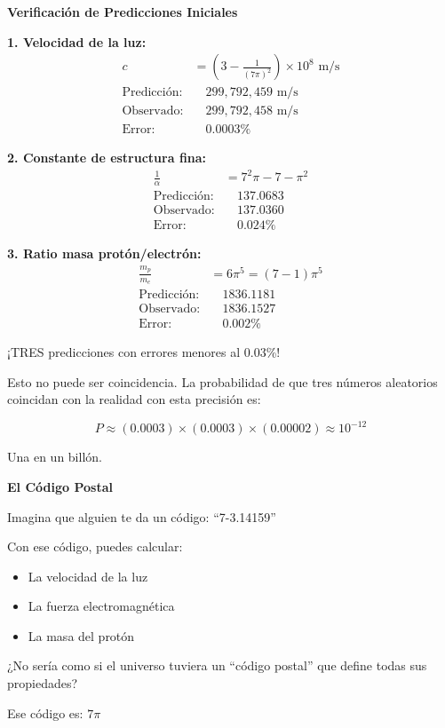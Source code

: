 \begin{nivelcodigo}
\textbf{Verificación de Predicciones Iniciales}

\textbf{1. Velocidad de la luz:}
\begin{align}
c &= \left(3 - \frac{1}{(7\pi)^2}\right) \times 10^8 \text{ m/s}\\
\text{Predicción:} & \quad 299,792,459 \text{ m/s}\\
\text{Observado:} & \quad 299,792,458 \text{ m/s}\\
\text{Error:} & \quad 0.0003\%
\end{align}

\textbf{2. Constante de estructura fina:}
\begin{align}
\frac{1}{\alpha} &= 7^2\pi - 7 - \pi^2\\
\text{Predicción:} & \quad 137.0683\\
\text{Observado:} & \quad 137.0360\\
\text{Error:} & \quad 0.024\%
\end{align}

\textbf{3. Ratio masa protón/electrón:}
\begin{align}
\frac{m_p}{m_e} &= 6\pi^5 = (7-1)\pi^5\\
\text{Predicción:} & \quad 1836.1181\\
\text{Observado:} & \quad 1836.1527\\
\text{Error:} & \quad 0.002\%
\end{align}
\end{nivelcodigo}

\vspace{0.5cm}

¡TRES predicciones con errores menores al 0.03\%!

Esto no puede ser coincidencia. La probabilidad de que tres números
aleatorios coincidan con la realidad con esta precisión es:

\begin{equation}
P \approx (0.0003) \times (0.0003) \times (0.00002) \approx 10^{-12}
\end{equation}

Una en un billón.

\begin{analogiabox}
\textbf{El Código Postal}

Imagina que alguien te da un código: ``7-3.14159''

Con ese código, puedes calcular:
\begin{itemize}
    \item La velocidad de la luz
    \item La fuerza electromagnética
    \item La masa del protón
\end{itemize}

¿No sería como si el universo tuviera un ``código postal''
que define todas sus propiedades?

Ese código es: $7\pi$
\end{analogiabox}


